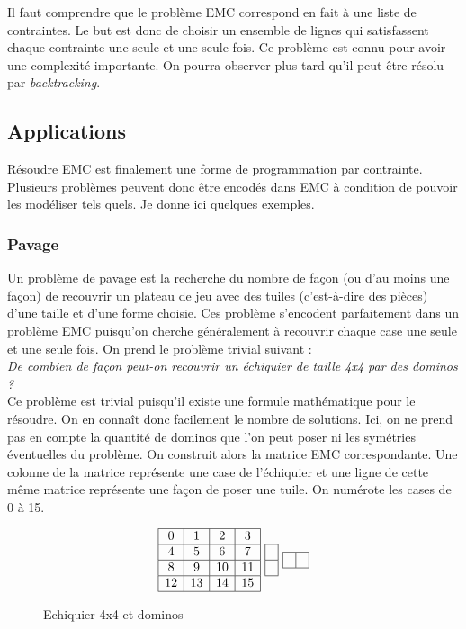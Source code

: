 \documentclass[a4paper]{article}
\begin{document}
Il faut comprendre que le problème EMC correspond en fait à une liste de 
contraintes. Le but est donc de choisir un ensemble de lignes qui satisfassent 
chaque contrainte une seule et une seule fois.
Ce problème est connu pour avoir une complexité importante. On pourra observer 
plus tard qu'il peut être résolu par \emph{backtracking}.


\subsection{Applications}

Résoudre EMC est finalement une forme de programmation par contrainte. 
Plusieurs problèmes peuvent donc être encodés dans EMC à 
condition de pouvoir les modéliser tels quels. Je donne ici quelques 
exemples.


\subsubsection{Pavage}
Un problème de pavage est la recherche du nombre de façon 
(ou d'au moins une façon) de recouvrir un
plateau de jeu avec des tuiles (c'est-à-dire des pièces) d'une taille et d'une
forme choisie. Ces problème s'encodent parfaitement dans un problème EMC
puisqu'on cherche généralement à recouvrir chaque case une seule et une 
seule fois. 
On prend le problème trivial suivant : \\


\emph{De combien de façon peut-on recouvrir un échiquier de taille 4x4 par 
des dominos ?}
\\

Ce problème est trivial puisqu'il existe une formule mathématique pour le 
résoudre. On en connaît donc facilement le nombre de solutions. 
Ici, on ne prend 
pas en compte la quantité de dominos que l'on peut poser ni les symétries 
éventuelles du problème. On construit alors la
matrice EMC correspondante. Une colonne de la matrice représente une case de 
l'échiquier et une ligne de cette même matrice représente une façon de poser 
une tuile. On numérote les cases de 0 à 15.

\begin{figure}[h]
\centering
{}
\[
  \begin{array}{|c|c|c|c|}
		\hline
   	0 & 1 & 2 & 3 \\
		\hline
    4	& 5 & 6 & 7 \\
		\hline
   	8 & 9 & 10 & 11 \\
		\hline
   	12 & 13 & 14 & 15 \\
		\hline
\end{array}
	\textrm{ }
\begin{array}{ |c| }
	\hline
		\\
	\hline
    \\
	\hline
  \end{array}
	\textrm{ }
\begin{array}{ |c|c| }
	\hline
		& \\ 
	\hline
  \end{array}
\]
\caption{\label{chessboard4x4} Echiquier 4x4 et dominos}
\end{figure}
\end{document}
